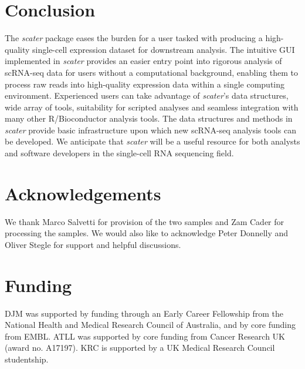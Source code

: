 \documentclass{bioinfo}
\begin{document}
\section{Conclusion}\label{conclusion}

The \emph{scater} package eases the burden for a user tasked with
producing a high-quality single-cell expression dataset for downstream analysis. The intuitive GUI implemented in \emph{scater} provides an easier entry point into rigorous analysis of scRNA-seq data for users without a
computational background, enabling them to process raw reads into high-quality expression data within a single computing environment. Experienced users can take advantage of \emph{scater}'s data structures, wide array of tools, suitability for scripted analyses and seamless integration with many other R/Bioconductor analysis tools. The data structures and methods in
\emph{scater} provide basic infrastructure upon which new scRNA-seq
analysis tools can be developed. We anticipate that \emph{scater} will be a
useful resource for both analysts and software developers in the
single-cell RNA sequencing field.\vspace*{-10pt}


\section*{Acknowledgements}\label{acknowledgements}

We thank Marco Salvetti for provision of the two samples and Zam Cader for processing the samples. We would also like to acknowledge Peter Donnelly and Oliver Stegle for support and helpful discussions.\vspace*{-12pt}

\section*{Funding}

DJM was supported by funding through an Early Career Fellowship from the National Health and Medical Research Council of Australia, and by core funding from EMBL. ATLL was supported by core funding from Cancer Research UK (award no. A17197). KRC is supported by a UK Medical Research Council studentship.\vspace*{-12pt}


%
%
%
%
%

\end{document}

